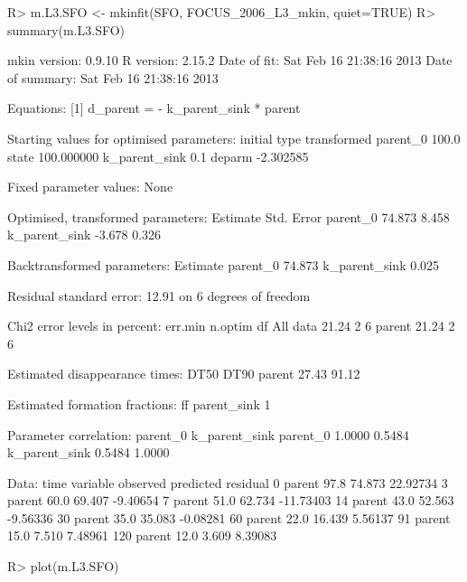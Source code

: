 \documentclass[12pt,a4paper]{article}
\begin{document}
\begin{Schunk}
\begin{Sinput}
R> m.L3.SFO <- mkinfit(SFO, FOCUS_2006_L3_mkin, quiet=TRUE)
R> summary(m.L3.SFO)
\end{Sinput}
\begin{Soutput}
mkin version:    0.9.10 
R version:       2.15.2 
Date of fit:     Sat Feb 16 21:38:16 2013 
Date of summary: Sat Feb 16 21:38:16 2013 

Equations:
[1] d_parent = - k_parent_sink * parent

Starting values for optimised parameters:
              initial   type transformed
parent_0        100.0  state  100.000000
k_parent_sink     0.1 deparm   -2.302585

Fixed parameter values:
None

Optimised, transformed parameters:
              Estimate Std. Error
parent_0        74.873      8.458
k_parent_sink   -3.678      0.326

Backtransformed parameters:
              Estimate
parent_0        74.873
k_parent_sink    0.025

Residual standard error: 12.91 on 6 degrees of freedom

Chi2 error levels in percent:
         err.min n.optim df
All data   21.24       2  6
parent     21.24       2  6

Estimated disappearance times:
        DT50  DT90
parent 27.43 91.12

Estimated formation fractions:
            ff
parent_sink  1

Parameter correlation:
              parent_0 k_parent_sink
parent_0        1.0000        0.5484
k_parent_sink   0.5484        1.0000

Data:
 time variable observed predicted  residual
    0   parent     97.8    74.873  22.92734
    3   parent     60.0    69.407  -9.40654
    7   parent     51.0    62.734 -11.73403
   14   parent     43.0    52.563  -9.56336
   30   parent     35.0    35.083  -0.08281
   60   parent     22.0    16.439   5.56137
   91   parent     15.0     7.510   7.48961
  120   parent     12.0     3.609   8.39083
\end{Soutput}
\begin{Sinput}
R> plot(m.L3.SFO)
\end{Sinput}
\end{Schunk}
\end{document}
